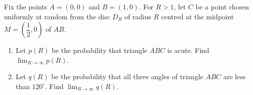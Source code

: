 Fix the points $A=(0,0)$ and $B=(1,0)$. For $R>1$, let $C$ be a point chosen uniformly at random from the disc $D_R$ of radius $R$ centred at the midpoint $M=\left(\dfrac12,0\right)$ of $AB$.
\begin{enumerate}
\item[(a)] Let $p(R)$ be the probability that triangle $ABC$ is acute. Find $\displaystyle\lim_{R\to\infty}p(R)$.
\item[(b)] Let $q(R)$ be the probability that all three angles of triangle $ABC$ are less than $120^\circ$. Find $\displaystyle\lim_{R\to\infty}q(R)$.
\end{enumerate}
